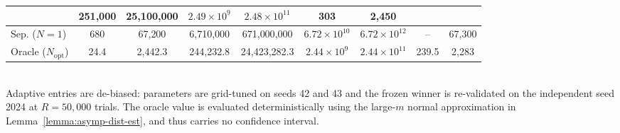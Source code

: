\begin{table}[ht]
\begin{tabular}{l c c c c c c c c}
& 251{,}000\hspace{0.45em}{\scriptsize [248{,}000, 254{,}000]}
& 25{,}100{,}000\hspace{0.45em}{\scriptsize [24{,}700{,}000, 25{,}400{,}000]}
& $2.49\times10^{9}$\hspace{0.45em}{\scriptsize [$2.46\times10^{9}$, $2.52\times10^{9}$]}
& $2.48\times10^{11}$\hspace{0.45em}{\scriptsize [$2.45\times10^{11}$, $2.51\times10^{11}$]}
& 303\hspace{0.45em}{\scriptsize [298, 307]}
& 2{,}450\hspace{0.45em}{\scriptsize [2{,}420, 2{,}480]} \\
\midrule
Sep. ($N=1$)
& 680\hspace{0.45em}{\scriptsize [669, 691]}
& 67{,}200\hspace{0.45em}{\scriptsize [66{,}300, 68{,}300]}
& 6{,}710{,}000\hspace{0.45em}{\scriptsize [6{,}620{,}000, 6{,}840{,}000]}
& 671{,}000{,}000\hspace{0.45em}{\scriptsize [662{,}000{,}000, 684{,}000{,}000]}
& $6.72\times10^{10}$\hspace{0.45em}{\scriptsize [$6.63\times10^{10}$, $6.83\times10^{10}$]}
& $6.72\times10^{12}$\hspace{0.45em}{\scriptsize [$6.63\times10^{12}$, $6.83\times10^{12}$]}
& --
& 67{,}300\hspace{0.45em}{\scriptsize [66{,}300, 68{,}500]} \\
\midrule
Oracle ($N_\text{opt}$)
& 24.4
& 2{,}442.3
& 244{,}232.8
& 24{,}423{,}282.3
& $2.44\times10^{9}$
& $2.44\times10^{11}$
& 239.5
& 2{,}283 \\
\bottomrule
\end{tabular}
\\[2pt]
\footnotesize Adaptive entries are de-biased: parameters are grid-tuned on seeds 42 and 43 and the frozen winner is re-validated on the independent seed 2024 at $R=50{,}000$ trials. The oracle value is evaluated deterministically using the large-$m$ normal approximation in Lemma~\ref{lemma:asymp-dist-est}, and thus carries no confidence interval.
\end{table}
